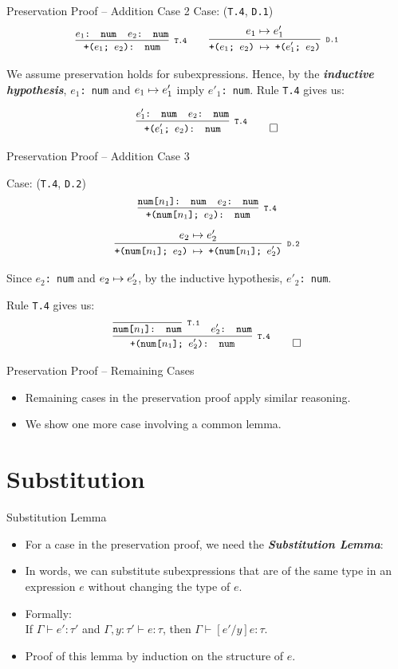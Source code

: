 \documentclass{beamer}
\renewcommand{\emph}[1]{\textbf{\textit{#1}}}
\begin{document}
\begin{frame}{Preservation Proof -- Addition Case 2}
Case: (\texttt{T.4}, \texttt{D.1})
\[
\cinfer[T.4]{+($e_1$; $e_2$): num}
  {\code{$e_1$: num} & \code{$e_2$: num}}
\qquad
\cinfer[D.1]{+($e_1$; $e_2$) $\stepto$ +($e'_1$; $e_2$)}{e_1 \stepto e'_1}
\]

We assume preservation holds for subexpressions.
Hence, by the \emph{inductive hypothesis},
\texttt{$e_1$: num} and $e_1 \mapsto e'_1$ imply
\texttt{$e'_1$: num}.
Rule \texttt{T.4} gives us:

\[
\cinfer[T.4]{+($e'_1$; $e_2$): num}
  {\code{$e'_1$: num} & \code{$e_2$: num}}
\qed
\]
\end{frame}


\begin{frame}{Preservation Proof -- Addition Case 3}

Case: (\texttt{T.4}, \texttt{D.2})
\[
\cinfer[T.4]{+(num[$n_1$]; $e_2$): num}
  {\code{num[$n_1$]: num} & \code{$e_2$: num}}
\]
\[
\cinfer[D.2]{+(num[$n_1$]; $e_2$) $\stepto$ +(num[$n_1$]; $e'_2$)}{e_2 \stepto e'_2}
\]

Since \texttt{$e_2$: num} and $e_2 \mapsto e'_2$,
by the inductive hypothesis, \texttt{$e'_2$: num}.

Rule \texttt{T.4} gives us:
\[
\cinfer[T.4]{+(num[$n_1$]; $e'_2$): num}
  {\cinfer[T.1]{num[$n_1$]: num}{ }
   &
   \code{$e'_2$: num}}
\qed
\]
\end{frame}


\begin{frame}{Preservation Proof -- Remaining Cases}
\begin{itemize}
\item Remaining cases in the preservation proof apply similar reasoning.
\item We show one more case involving a common lemma.
\end{itemize}
\end{frame}

\section{Substitution}

\begin{frame}{Substitution Lemma}
\begin{itemize}
\item
For a case in the preservation proof, we need the
\emph{Substitution Lemma}:

\item
In words, we can substitute subexpressions that are of the
same type in an expression $e$ without changing the type of $e$.

\pause
\item
Formally: \\
If $\Gamma \vdash e' : \tau'$ and $\Gamma, y : \tau' \vdash e : \tau$,
then $\Gamma \vdash [e' / y]e : \tau$.

\item
Proof of this lemma by induction on the structure of $e$.
\end{itemize}
\end{frame}
\end{document}
